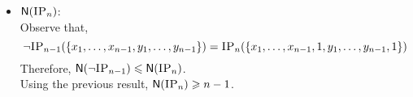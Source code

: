 \documentclass[usletter]{article}
\newcommand {\complexity}[1] {\ensuremath{\mathsf{#1}}}
\newcommand {\N}             {\complexity{N}}
\newcommand {\RS}[1]         {\ensuremath{\complexity{RS}_{#1}}}
\newcommand {\function}[2]  {\ensuremath{\textsc{#1}_{#2}}}
\newcommand {\vdim}     {\ensuremath{\mathbf{dim}}}
\newcommand {\vspan}    {\ensuremath{\mathbf{span}}}
\begin{document}
\begin{itemize}
    \begin{claim}Over $\mathbb{F}_2$,
        $\displaystyle \RS{\mu}(\neg\function{IP}{n}) < \frac{1}{2^{n-1}}$
    \end{claim}
    \begin{proof}
        Over $\mathbb{F}_2$,
        $$
            \neg\function{IP}{n}(x,y) = 1 + \langle x,y \rangle =
              \begin{cases}
                1 &\quad \text{if } \langle x,y \rangle = 0 \\
                0 &\quad \text{otherwise}
              \end{cases}
        $$
        Let $R$ be a $0$-monochromatic rectangle $A \times B$. Then,
        \begin{align*}
          & \forall x \in A, y \in B : \langle x,y \rangle = 0 \\
          \Rightarrow\ & \forall x \in \vspan(A), y \in \vspan(B) : \langle x,y \rangle = 0 \\
          \Rightarrow\ & \vspan(A) \text{ and } \vspan(B) \text{ are \textit{orthogonal} in } \mathbb{F}_2 \\
          \Rightarrow\ & \vdim(\vspan(A)) + \vdim(\vspan(B)) \leqslant n \\
          ~\\
          |A \times B| \leqslant\ & |\vspan(A) \times \vspan(B)| \\
          \leqslant\ & 2^{\vdim(\vspan(A)) + \vdim(\vspan(B))} \\
          \leqslant\ & 2^n \\
          ~\\
          \mu(R) =\ & \frac{|\vspan(A) \times \vspan(B)|}{2^n + (2^n-1)2^{n-1}} \\
          <\ & \frac{1}{2^{n-1}}
        \end{align*}
    \end{proof}

    Since $\RS{}(f) \leqslant \RS{\mu}(f)$, we have $\N(\neg\function{IP}{n}) \geqslant n$.
  \item $\N(\function{IP}{n})$: \\
  Observe that,
  $$
  \neg\function{IP}{n-1}(\{x_1, \ldots , x_{n-1}, y_1, \ldots, y_{n-1}\}) = \function{IP}{n}(\{x_1, \ldots , x_{n-1}, 1, y_1, \ldots, y_{n-1}, 1\})
  $$
  Therefore, $\N(\neg\function{IP}{n-1}) \leqslant \N(\function{IP}{n})$. \\
  Using the previous result, $\N(\function{IP}{n}) \geqslant n-1$.
\end{itemize}
\end{document}
